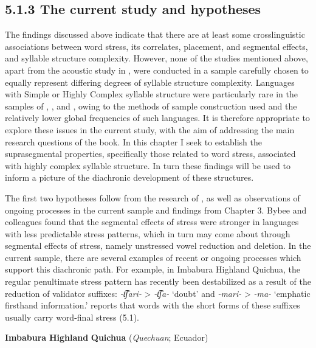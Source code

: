 \subsection{5.1.3 The current study and hypotheses}

  The findings discussed above indicate that there are at least some crosslinguistic associations between word stress, its correlates, placement, and segmental effects, and syllable structure complexity. However, none of the studies mentioned above, apart from the acoustic study in \citet{EasterdayEtAl2011}, were conducted in a sample carefully chosen to equally represent differing degrees of syllable structure complexity. Languages with Simple or Highly Complex syllable structure were particularly rare in the samples of \citet{Auer1993}, \citet{BybeeEtAl1998}, and \citet{Schiering2007}, owing to the methods of sample construction used and the relatively lower global frequencies of such languages. It is therefore appropriate to explore these issues in the current study, with the aim of addressing the main research questions of the book. In this chapter I seek to establish the suprasegmental properties, specifically those related to word stress, associated with highly complex syllable structure. In turn these findings will be used to inform a picture of the diachronic development of these structures.



  The first two hypotheses follow from the research of \citet{BybeeEtAl1998}, as well as observations of ongoing processes in the current sample and findings from Chapter 3. Bybee and colleagues found that the segmental effects of stress were stronger in languages with less predictable stress patterns, which in turn may come about through segmental effects of stress, namely unstressed vowel reduction and deletion. In the current sample, there are several examples of recent or ongoing processes which support this diachronic path. For example, in Imbabura Highland Quichua, the regular penultimate stress pattern has recently been destabilized as a result of the reduction of validator suffixes: \textit{{}-t͡ʃari{}-} > \textit{{}-t͡ʃa{}-} ‘doubt’ and \textit{{}-mari-} > \textit{{}-ma-} ‘emphatic firsthand information.’ \citet{Cole1982} reports that words with the short forms of these suffixes usually carry word-final stress (5.1).



\ea\label{ex:(5.1)}
  \textbf{Imbabura} \textbf{Highland} \textbf{Quichua} (\textit{Quechuan}; Ecuador)



